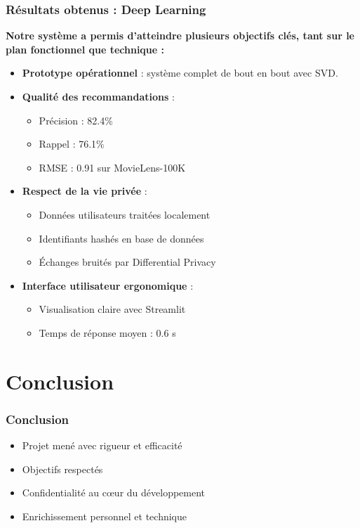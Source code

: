 \documentclass{beamer}
\begin{document}
\begin{frame}
    \frametitle{Résultats obtenus : Deep Learning}
    \scriptsize
    \textbf{Notre système a permis d’atteindre plusieurs objectifs clés, tant sur le plan fonctionnel que technique :}

    \vspace{0.3cm}
    \begin{itemize}
        \item \textbf{Prototype opérationnel} : système complet de bout en bout avec SVD.
        \item \textbf{Qualité des recommandations} :
        \begin{itemize}
            \item Précision : 82.4\%
            \item Rappel : 76.1\%
            \item RMSE : 0.91 sur MovieLens-100K
        \end{itemize}
        \item \textbf{Respect de la vie privée} :
        \begin{itemize}
            \item Données utilisateurs traitées localement
            \item Identifiants hashés en base de données
            \item Échanges bruités par Differential Privacy
        \end{itemize}
        \item \textbf{Interface utilisateur ergonomique} :
        \begin{itemize}
            \item Visualisation claire avec Streamlit
            \item Temps de réponse moyen : 0.6 s
        \end{itemize}
    \end{itemize}
\end{frame}


\section{Conclusion}
\begin{frame}
    \frametitle{Conclusion}
    \begin{itemize}
        \item Projet mené avec rigueur et efficacité
        \item Objectifs respectés
        \item Confidentialité au cœur du développement
        \item Enrichissement personnel et technique
    \end{itemize}
\end{frame}
\end{document}
